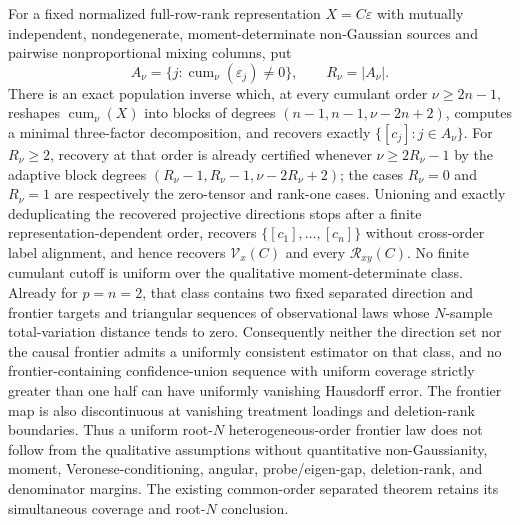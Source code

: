For a fixed normalized full-row-rank representation \(X=C\varepsilon\) with mutually independent, nondegenerate, moment-determinate non-Gaussian sources and pairwise nonproportional mixing columns, put
\[
 A_\nu=\{j:\operatorname{cum}_\nu(\varepsilon_j)\ne0\},
 \qquad R_\nu=|A_\nu|.
\]
There is an exact population inverse which, at every cumulant order \(\nu\ge2n-1\), reshapes \(\operatorname{cum}_\nu(X)\) into blocks of degrees \((n-1,n-1,\nu-2n+2)\), computes a minimal three-factor decomposition, and recovers exactly \(\{[c_j]:j\in A_\nu\}\). For \(R_\nu\ge2\), recovery at that order is already certified whenever \(\nu\ge2R_\nu-1\) by the adaptive block degrees \((R_\nu-1,R_\nu-1,\nu-2R_\nu+2)\); the cases \(R_\nu=0\) and \(R_\nu=1\) are respectively the zero-tensor and rank-one cases. Unioning and exactly deduplicating the recovered projective directions stops after a finite representation-dependent order, recovers \(\{[c_1],\ldots,[c_n]\}\) without cross-order label alignment, and hence recovers \(\mathcal V_x(C)\) and every \(\mathcal R_{xy}(C)\). No finite cumulant cutoff is uniform over the qualitative moment-determinate class. Already for \(p=n=2\), that class contains two fixed separated direction and frontier targets and triangular sequences of observational laws whose \(N\)-sample total-variation distance tends to zero. Consequently neither the direction set nor the causal frontier admits a uniformly consistent estimator on that class, and no frontier-containing confidence-union sequence with uniform coverage strictly greater than one half can have uniformly vanishing Hausdorff error. The frontier map is also discontinuous at vanishing treatment loadings and deletion-rank boundaries. Thus a uniform root-\(N\) heterogeneous-order frontier law does not follow from the qualitative assumptions without quantitative non-Gaussianity, moment, Veronese-conditioning, angular, probe/eigen-gap, deletion-rank, and denominator margins. The existing common-order separated theorem retains its simultaneous coverage and root-\(N\) conclusion.